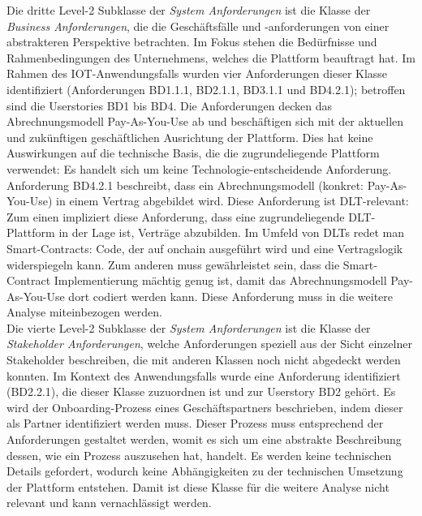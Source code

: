Die dritte Level-2 Subklasse der \textit{System Anforderungen} ist die Klasse der \textit{Business Anforderungen}, die die Geschäftsfälle und -anforderungen von einer abstrakteren Perspektive betrachten. Im Fokus stehen die Bedürfnisse und Rahmenbedingungen des Unternehmens, welches die Plattform beauftragt hat. Im Rahmen des IOT-Anwendungsfalls wurden vier Anforderungen dieser Klasse identifiziert (Anforderungen BD1.1.1, BD2.1.1, BD3.1.1 und BD4.2.1); betroffen sind die Userstories BD1 bis BD4. Die Anforderungen decken das Abrechnungsmodell Pay-As-You-Use ab und beschäftigen sich mit der aktuellen und zukünftigen geschäftlichen Ausrichtung der Plattform. Dies hat keine Auswirkungen auf die technische Basis, die die zugrundeliegende Plattform verwendet: Es handelt sich um keine Technologie-entscheidende Anforderung. Anforderung BD4.2.1 beschreibt, dass ein Abrechnungsmodell (konkret: Pay-As-You-Use) in einem Vertrag abgebildet wird. Diese Anforderung ist \ac{DLT}-relevant: Zum einen impliziert diese Anforderung, dass eine zugrundeliegende \ac{DLT}-Plattform in der Lage ist, Verträge abzubilden. Im Umfeld von \ac{DLT}s redet man Smart-Contracts: Code, der auf onchain ausgeführt wird und eine Vertragslogik widerspiegeln kann. Zum anderen muss gewährleistet sein, dass die Smart-Contract Implementierung mächtig genug ist, damit das Abrechnungsmodell Pay-As-You-Use dort codiert werden kann. Diese Anforderung muss in die weitere Analyse miteinbezogen werden.\\

Die vierte Level-2 Subklasse der \textit{System Anforderungen} ist die Klasse der \textit{Stakeholder Anforderungen}, welche Anforderungen speziell aus der Sicht einzelner Stakeholder beschreiben, die mit anderen Klassen noch nicht abgedeckt werden konnten. Im Kontext des Anwendungsfalls wurde eine Anforderung identifiziert (BD2.2.1), die dieser Klasse zuzuordnen ist und zur Userstory BD2 gehört. Es wird der Onboarding-Prozess eines Geschäftspartners beschrieben, indem dieser als Partner identifiziert werden muss. Dieser Prozess muss entsprechend der Anforderungen gestaltet werden, womit es sich um eine abstrakte Beschreibung dessen, wie ein Prozess auszusehen hat, handelt. Es werden keine technischen Details gefordert, wodurch keine Abhängigkeiten zu der technischen Umsetzung der Plattform entstehen. Damit ist diese Klasse für die weitere Analyse nicht relevant und kann vernachlässigt werden.\\

